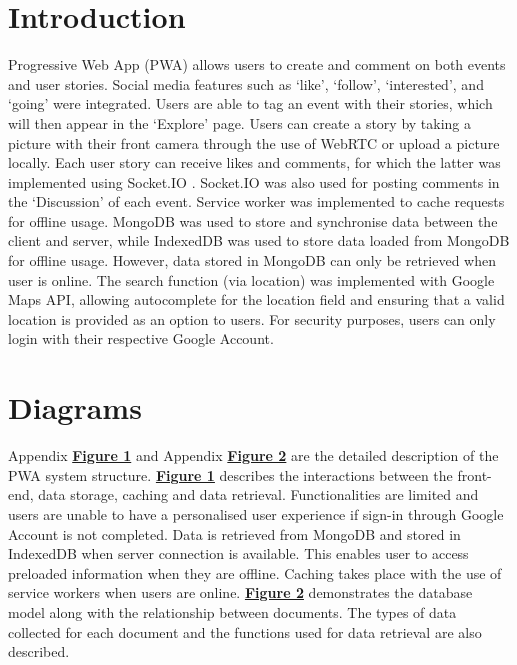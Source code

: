 \documentclass[11pt, a4paper]{article}
\begin{document}
\section{Introduction}
Progressive Web App (PWA) allows users to create and comment on both events and user stories. Social
media features such as `like', `follow', `interested', and `going' were integrated. Users are able
to tag an event with their stories, which will then appear in the `Explore' page. Users can create a
story by taking a picture with their front camera through the use of WebRTC or upload a picture
locally. Each user story can receive likes and comments, for which the latter was implemented using
Socket.IO \cite{week6, socketio}. Socket.IO was also used for posting comments in the `Discussion'
of each event. Service worker was implemented to cache requests for offline usage. MongoDB was used
to store and synchronise data between the client and server, while IndexedDB was used to store data
loaded from MongoDB for offline usage. However, data stored in MongoDB can only be retrieved when
user is online. The search function (via location) was implemented with Google Maps API, allowing
autocomplete for the location field and ensuring that a valid location is provided as an option to
users. For security purposes, users can only login with their respective Google Account.

\section{Diagrams}
Appendix \hyperref[figure:site_map]{\textbf{Figure 1}} and Appendix
\hyperref[figure:uml]{\textbf{Figure 2}} are the detailed description of the PWA system structure.
\hyperref[figure:site_map]{\textbf{Figure 1}} describes the interactions between the front-end, data
storage, caching and data retrieval. Functionalities are limited and users are unable to have a
personalised user experience if sign-in through Google Account is not completed. Data is retrieved
from MongoDB and stored in IndexedDB when server connection is available. This enables user to
access preloaded information when they are offline. Caching takes place with the use of service
workers when users are online. \hyperref[figure:uml]{\textbf{Figure 2}} demonstrates the database
model along with the relationship between documents. The types of data collected for each document
and the functions used for data retrieval are also described.
\end{document}
